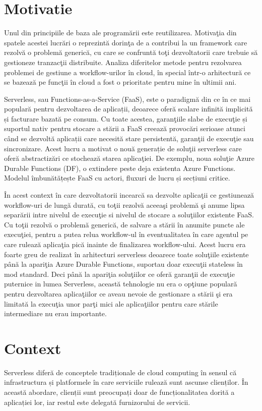 \section{Motivatie}
\quad Unul din principiile de baza ale programării este reutilizarea. Motivaţia din spatele acestei lucrări o reprezintă dorinţa de a contribui la un framework care rezolvă o problemă generică, cu care se confruntă toţi dezvoltatorii care trebuie să gestioneze tranzacţii distribuite. Analiza diferitelor metode pentru rezolvarea problemei de gestiune a workflow-urilor în cloud, în special într-o arhitectură ce se bazează pe funcţii în cloud a fost o prioritate pentru mine în ultimii ani. 
\par
Serverless, sau Functions-as-a-Service (FaaS), este o paradigmă din ce în ce mai populară pentru dezvoltarea de aplicații, deoarece oferă scalare infinită implicită și facturare bazată pe consum. Cu toate acestea, garanţiile slabe de execuţie și suportul nativ pentru stocare a stării a FaaS creează provocări serioase atunci când se dezvoltă aplicații care necesită stare persistentă, garanţii de execuţie sau sincronizare. Acest lucru a motivat o nouă generație de soluţii serverless care oferă abstractizări ce stochează starea aplicaţiei. De exemplu, noua soluţie Azure Durable Functions (DF), o extindere peste deja existenta Azure Functions. Modelul îmbunătățește FaaS cu actori, fluxuri de lucru și secțiuni critice.
\par
În acest context în care dezvoltatorii incearcă sa dezvolte aplicaţii ce gestiunează workflow-uri  de lungă durată, cu toţii rezolvă aceeaşi problemă şi anume lipsa separării intre nivelul de execuţie si nivelul de stocare a soluţiilor existente FaaS. Cu toţii rezolvă o problemă generică, de salvare a stării în anumite puncte ale execuţiei, pentru a putea relua workflow-ul în eventualitatea în care agentul pe care rulează aplicaţia pică inainte de finalizarea workflow-ului. Acest lucru era foarte greu de realizat în arhitecturi serverless deoarece toate soluţiile existente până la apariţia Azure Durable Functions, suportau doar execuţii stateless în mod standard. Deci până la apariţia soluţiilor ce oferă garanţii de execuţie puternice in lumea Serverless, această tehnologie nu era o opţiune populară pentru dezvoltarea aplicaţiilor ce aveau nevoie de gestionare a stării şi era limitată la execuţia unor parţi mici ale aplicaţiilor pentru care stările intermediare nu erau importante. 
\section{Context}
\quad Serverless diferă de conceptele tradiționale de cloud computing în sensul că infrastructura și platformele în care serviciile rulează sunt ascunse clienților. În această abordare, clienții sunt preocupați doar de funcționalitatea dorită a aplicației lor, iar restul este delegată furnizorului de servicii. \par

